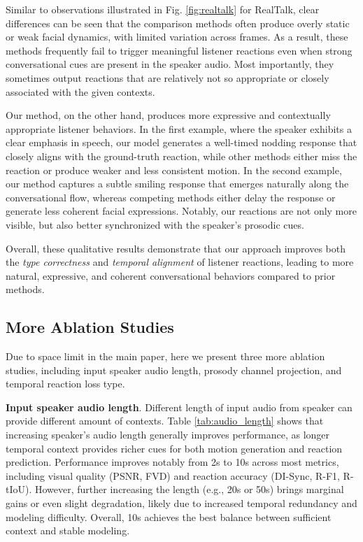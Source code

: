 Similar to observations illustrated in Fig. \ref{fig:realtalk} for RealTalk, clear differences can be seen that the comparison methods often produce overly static or weak facial dynamics, with limited variation across frames. As a result, these methods frequently fail to trigger meaningful listener reactions even when strong conversational cues are present in the speaker audio. Most importantly, they sometimes output reactions that are relatively not so appropriate or closely associated with the given contexts.

Our method, on the other hand, produces more expressive and contextually appropriate listener behaviors. In the first example, where the speaker exhibits a clear emphasis in speech, our model generates a well-timed nodding response that closely aligns with the ground-truth reaction, while other methods either miss the reaction or produce weaker and less consistent motion. In the second example, our method captures a subtle smiling response that emerges naturally along the conversational flow, whereas competing methods either delay the response or generate less coherent facial expressions. Notably, our reactions are not only more visible, but also better synchronized with the speaker’s prosodic cues.

Overall, these qualitative results demonstrate that our approach improves both the \textit{type correctness} and \textit{temporal alignment} of listener reactions, leading to more natural, expressive, and coherent conversational behaviors compared to prior methods.








\subsection{More Ablation Studies}  \label{sec:appendix-ablation}

Due to space limit in the main paper, here we present three more ablation studies, including input speaker audio length, prosody channel projection, and temporal reaction loss type.


\textbf{Input speaker audio length}. Different length of input audio from speaker can provide different amount of contexts. Table \ref{tab:audio_length} shows that increasing speaker's audio length generally improves performance, as longer temporal context provides richer cues for both motion generation and reaction prediction. Performance improves notably from 2s to 10s across most metrics, including visual quality (PSNR, FVD) and reaction accuracy (DI-Sync, R-F1, R-tIoU). However, further increasing the length (e.g., 20s or 50s) brings marginal gains or even slight degradation, likely due to increased temporal redundancy and modeling difficulty. Overall, 10s achieves the best balance between sufficient context and stable modeling.

